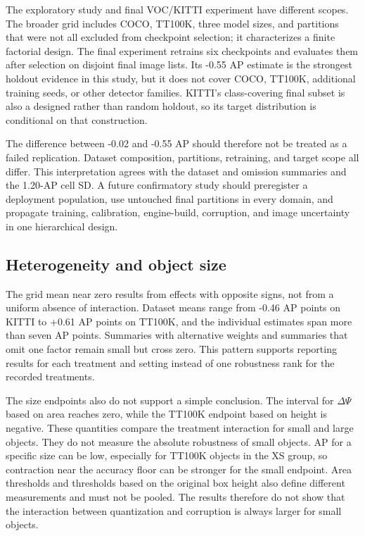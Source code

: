 \documentclass[a4paper,fleqn]{cas-dc}
\begin{document}
The exploratory study and final VOC/KITTI experiment have different scopes. The broader grid includes COCO, TT100K, three model sizes, and partitions that were not all excluded from checkpoint selection; it characterizes a finite factorial design. The final experiment retrains six checkpoints and evaluates them after selection on disjoint final image lists. Its -0.55 AP estimate is the strongest holdout evidence in this study, but it does not cover COCO, TT100K, additional training seeds, or other detector families. KITTI's class-covering final subset is also a designed rather than random holdout, so its target distribution is conditional on that construction.

The difference between -0.02 and -0.55 AP should therefore not be treated as a failed replication. Dataset composition, partitions, retraining, and target scope all differ. This interpretation agrees with the dataset and omission summaries and the 1.20-AP cell SD. A future confirmatory study should preregister a deployment population, use untouched final partitions in every domain, and propagate training, calibration, engine-build, corruption, and image uncertainty in one hierarchical design.

\subsection{Heterogeneity and object size}

The grid mean near zero results from effects with opposite signs, not from a uniform absence of interaction. Dataset means range from -0.46 AP points on KITTI to +0.61 AP points on TT100K, and the individual estimates span more than seven AP points. Summaries with alternative weights and summaries that omit one factor remain small but cross zero. This pattern supports reporting results for each treatment and setting instead of one robustness rank for the recorded treatments.

The size endpoints also do not support a simple conclusion. The interval for $\Delta\Psi$ based on area reaches zero, while the TT100K endpoint based on height is negative. These quantities compare the treatment interaction for small and large objects. They do not measure the absolute robustness of small objects. AP for a specific size can be low, especially for TT100K objects in the XS group, so contraction near the accuracy floor can be stronger for the small endpoint. Area thresholds and thresholds based on the original box height also define different measurements and must not be pooled. The results therefore do not show that the interaction between quantization and corruption is always larger for small objects.
\end{document}
